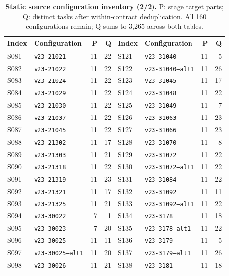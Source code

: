 \begin{table}[p]
\centering\footnotesize
\caption{\textbf{Static source configuration inventory (2/2).} P: stage target parts; Q: distinct tasks after within-contract deduplication. All 160 configurations remain; Q sums to 3,265 across both tables.}
\begin{tabular}{@{}llrr@{\qquad}llrr@{}}
\toprule
Index & Configuration & P & Q & Index & Configuration & P & Q\\
\midrule
S081 & \texttt{v23-21021} & 11 & 22 & S121 & \texttt{v23-31040} & 11 & 5\\
S082 & \texttt{v23-21022} & 11 & 22 & S122 & \texttt{v23-31040--alt1} & 11 & 26\\
S083 & \texttt{v23-21024} & 11 & 22 & S123 & \texttt{v23-31045} & 11 & 17\\
S084 & \texttt{v23-21029} & 11 & 22 & S124 & \texttt{v23-31048} & 11 & 22\\
S085 & \texttt{v23-21030} & 11 & 22 & S125 & \texttt{v23-31049} & 11 & 7\\
S086 & \texttt{v23-21037} & 11 & 22 & S126 & \texttt{v23-31063} & 11 & 23\\
S087 & \texttt{v23-21045} & 11 & 22 & S127 & \texttt{v23-31066} & 11 & 23\\
S088 & \texttt{v23-21302} & 11 & 17 & S128 & \texttt{v23-31070} & 11 & 8\\
S089 & \texttt{v23-21303} & 11 & 21 & S129 & \texttt{v23-31072} & 11 & 22\\
S090 & \texttt{v23-21318} & 11 & 22 & S130 & \texttt{v23-31072--alt1} & 11 & 22\\
S091 & \texttt{v23-21319} & 11 & 23 & S131 & \texttt{v23-31084} & 11 & 22\\
S092 & \texttt{v23-21321} & 11 & 17 & S132 & \texttt{v23-31092} & 11 & 11\\
S093 & \texttt{v23-21325} & 11 & 21 & S133 & \texttt{v23-31092--alt1} & 11 & 22\\
S094 & \texttt{v23-30022} & 7 & 1 & S134 & \texttt{v23-3178} & 11 & 18\\
S095 & \texttt{v23-30023} & 7 & 20 & S135 & \texttt{v23-3178--alt1} & 11 & 22\\
S096 & \texttt{v23-30025} & 11 & 11 & S136 & \texttt{v23-3179} & 11 & 5\\
S097 & \texttt{v23-30025--alt1} & 11 & 20 & S137 & \texttt{v23-3179--alt1} & 11 & 26\\
S098 & \texttt{v23-30026} & 11 & 21 & S138 & \texttt{v23-3181} & 11 & 18\\

\end{tabular}
\end{table}
